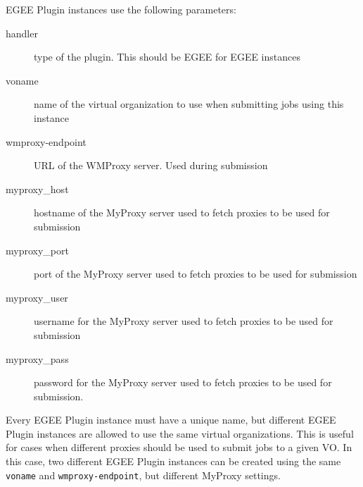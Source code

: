 \documentclass[a4paper, 12pt]{article}
\begin{document}
EGEE Plugin instances use the following parameters:
\begin{description}
\item[handler] type of the plugin. This should be EGEE for EGEE instances
\item[voname] name of the virtual organization to use when submitting jobs using this instance
\item[wmproxy-endpoint] URL of the WMProxy server. Used during submission
\item[myproxy\_host] hostname of the MyProxy server used to fetch proxies to be used for submission
\item[myproxy\_port] port of the MyProxy server used to fetch proxies to be used for submission
\item[myproxy\_user] username for the MyProxy server used to fetch proxies to be used for submission
\item[myproxy\_pass] password for the MyProxy server used to fetch proxies to be used for submission.
\end{description}

Every EGEE Plugin instance must have a unique name, but different EGEE Plugin instances are allowed to use the same virtual organizations. This is useful for cases when different proxies should be used to submit jobs to a given VO. In this case, two different EGEE Plugin instances can be created using the same \texttt{voname} and \texttt{wmproxy-endpoint}, but different MyProxy settings.
\end{document}
